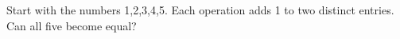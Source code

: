 Start with the numbers 1,2,3,4,5. Each operation adds 1 to two distinct entries. Can all five become equal?
